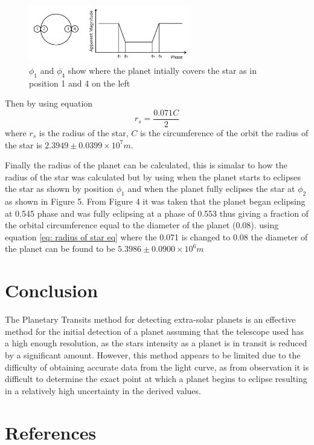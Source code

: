 \documentclass[]{article}
\begin{document}
\begin{figure}[h]
  \includegraphics[width=7cm]{images/planet transit of star.png}
  \caption{$\phi_1 $ and $\phi_4$ show where the planet intially covers
   the star as in position 1 and 4 on the left}
  \label{fig:HD-_init}
  \end{figure}

Then by using equation 
\begin{equation}\label{eq: radius of star eq}
  r_s = \frac{0.071C}{2}
  \end{equation}
where $r_s$ is the radius of the star, $C$ is the circumference of the orbit
the radius of the star is $2.3949\pm0.0399\times10^7m $.
\par
Finally the radius of the planet can be calculated, this is 
simalar to how the radius of the star was calculated but 
by using when the planet starts to eclipses the star as shown by 
position $\phi_1$ and when the planet fully eclipses the star
at $\phi_2$ as shown in Figure 5.
From Figure 4 it was taken that the planet began eclipsing at 0.545 phase
and was fully eclipsing at a phase of 0.553 thus giving a fraction 
of the orbital circumference equal to the diameter of the planet (0.08).
using equation \ref{eq: radius of star eq} where the 0.071 is changed 
to 0.08 the diameter of the planet can be found to be $5.3986\pm 0.0900\times10^6m $
\section*{Conclusion}

The Planetary Transits method for detecting extra-solar planets
is an effective method for the initial detection of a planet
assuming that the telescope used has a high enough resolution,  
as the stars intensity as a planet is in transit is reduced by a
significant amount. However, this method appears to be limited due 
to the difficulty of obtaining accurate data from the light curve, 
as from observation it is difficult to determine the exact point 
at which a planet begins to eclipse resulting in a relatively high
uncertainty in the derived values.




\newpage
\onecolumn
\section*{References}
\end{document}
